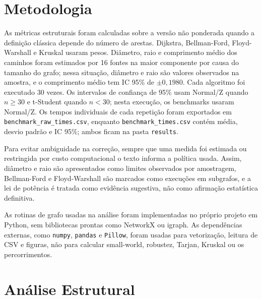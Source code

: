 \documentclass[sigconf]{webmedia}
\begin{document}
\section{Metodologia}

As métricas estruturais foram calculadas sobre a versão não ponderada
quando a definição clássica depende do número de arestas. Dijkstra,
Bellman-Ford, Floyd-Warshall e Kruskal usaram pesos. Diâmetro, raio e
comprimento médio dos caminhos foram estimados por 16 fontes na maior
componente por causa do tamanho do grafo; nessa situação, diâmetro e
raio são valores observados na amostra, e o comprimento médio tem IC
95\% de $\pm 0,1980$. Cada algoritmo foi executado 30 vezes. Os
intervalos de confiança de 95\% usam Normal/Z quando $n \geq 30$ e
t-Student quando $n < 30$; nesta execução, os benchmarks usaram
Normal/Z. Os tempos individuais de cada repetição foram
exportados em \texttt{benchmark\_raw\_times.csv}, enquanto
\texttt{benchmark\_times.csv} contém média, desvio padrão e IC 95\%;
ambos ficam na pasta \texttt{results}.

Para evitar ambiguidade na correção, sempre que uma medida foi estimada
ou restringida por custo computacional o texto informa a política usada.
Assim, diâmetro e raio são apresentados como limites observados por
amostragem, Bellman-Ford e Floyd-Warshall são marcados como execuções em
subgrafos, e a lei de potência é tratada como evidência sugestiva, não
como afirmação estatística definitiva.

As rotinas de grafo usadas na análise foram implementadas no
próprio projeto em Python, sem bibliotecas prontas como NetworkX ou
igraph. As dependências externas, como \texttt{numpy}, \texttt{pandas}
e \texttt{Pillow}, foram usadas para vetorização, leitura de CSV e
figuras, não para calcular
small-world, robustez, Tarjan, Kruskal ou os percorrimentos.

\section{Análise Estrutural}
\end{document}
